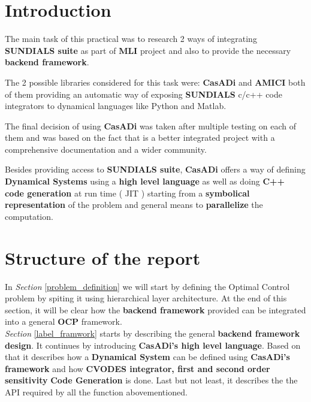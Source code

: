 \documentclass[12pt, letterpaper]{article}
\begin{document}
\section{Introduction}
The main task of this practical was to research 2 ways of integrating \textbf{SUNDIALS suite} as part of \textbf{MLI}  project and also to provide the necessary  \textbf{backend framework}.

The 2 possible libraries considered for this task were: \textbf{CasADi} \cite{Andersson2018} and \textbf{AMICI} \cite{frohlich2020amici} both of them providing an automatic way of exposing \textbf{SUNDIALS} c/c++ code integrators to dynamical languages like Python and Matlab.

The final decision of using \textbf{CasADi} was taken after multiple testing on each of them and was based on the fact that is a better integrated project with a comprehensive documentation and a wider community. 


Besides providing access to \textbf{SUNDIALS suite}, \textbf{CasADi} offers a way of defining \textbf{Dynamical Systems} using a \textbf{high level language} as well as doing \textbf{C++ code generation} at run time ( JIT ) starting from a \textbf{symbolical representation} of the problem and general means to \textbf{parallelize} the computation.
 
\section{Structure of the report}


In \textit{Section} \ref{problem_definition} we will start by defining the Optimal Control problem by spiting it using hierarchical layer architecture. At the end of this section, it will be clear how the \textbf{backend framework} provided can be integrated into a general \textbf{OCP} framework.\\



\textit{Section} \ref{label_framwork} starts by describing the general \textbf{backend framework design}. It continues by introducing \textbf{CasADi's high level language}. Based on that it describes how a \textbf{Dynamical System} can be defined using \textbf{CasADi's framework} and how \textbf{CVODES integrator, first and second order sensitivity}   \textbf{Code Generation} is done. 
Last but not least, it describes the the API required by all the function abovementioned.\\
\end{document}
